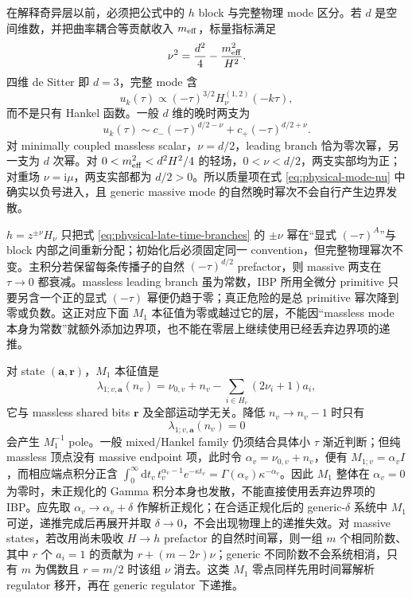 \documentclass[11pt,a4paper]{ctexart}
\newcommand{\dd}{\mathrm d}
\newcommand{\ii}{\mathrm i}
\begin{document}
在解释奇异层以前，必须把公式中的 $h$ block 与完整物理 mode 区分。若 $d$ 是空间维数，并把曲率耦合等贡献收入 $m_{\rm eff}$，标量指标满足
\begin{equation}
 \nu^2=\frac{d^2}{4}-\frac{m_{\rm eff}^2}{H^2}.
 \label{eq:physical-mode-nu}
\end{equation}
四维 de Sitter 即 $d=3$，完整 mode 含
\begin{equation}
 u_k(\tau)\propto(-\tau)^{3/2}H_\nu^{(1,2)}(-k\tau),
 \label{eq:physical-mode-full-power}
\end{equation}
而不是只有 Hankel 函数。一般 $d$ 维的晚时两支为
\begin{equation}
 u_k(\tau)\sim c_-(-\tau)^{d/2-\nu}
 +c_+(-\tau)^{d/2+\nu}.
 \label{eq:physical-late-time-branches}
\end{equation}
对 minimally coupled massless scalar，$\nu=d/2$，leading branch 恰为零次幂，另一支为 $d$ 次幂。对 $0<m_{\rm eff}^2<d^2H^2/4$ 的轻场，$0<\nu<d/2$，两支实部均为正；对重场 $\nu=\ii\mu$，两支实部都为 $d/2>0$。所以质量项在式 \eqref{eq:physical-mode-nu} 中确实以负号进入，且 generic massive mode 的自然晚时幂次不会自行产生边界发散。

$h=z^{\pm\nu}H_\nu$ 只把式 \eqref{eq:physical-late-time-branches} 的 $\pm\nu$ 幂在“显式 $(-\tau)^A$”与 block 内部之间重新分配；初始化后必须固定同一 convention，但完整物理幂次不变。主积分若保留每条传播子的自然 $(-\tau)^{d/2}$ prefactor，则 massive 两支在 $\tau\to0$ 都衰减。massless leading branch 虽为常数，IBP 所用全微分 primitive 只要另含一个正的显式 $(-\tau)$ 幂便仍趋于零；真正危险的是总 primitive 幂次降到零或负数。这正对应下面 $M_1$ 本征值为零或越过它的层，不能因“massless mode 本身为常数”就额外添加边界项，也不能在零层上继续使用已经丢弃边界项的递推。

对 state $(\bm a,\bm r)$，$M_1$ 本征值是
\begin{equation}
 \lambda_{1;v,\bm a}(n_v)
 =\nu_{0,v}+n_v
 -\sum_{i\in H_v}(2\nu_i+1)a_i,
 \label{eq:M1-general-eigenvalue}
\end{equation}
它与 massless shared bits $\bm r$ 及全部运动学无关。降低 $n_v\to n_v-1$ 时只有
\begin{equation}
 \lambda_{1;v,\bm a}(n_v)=0
 \label{eq:M1-lowering-resonance}
\end{equation}
会产生 $M_1^{-1}$ pole。一般 mixed/Hankel family 仍须结合具体小 $\tau$ 渐近判断；但纯 massless 顶点没有 massive endpoint 项，此时令 $\alpha_v=\nu_{0,v}+n_v$，便有 $M_{1;v}=\alpha_v I$，而相应端点积分正含 $\int_0^\infty\!\dd t_v\,t_v^{\alpha_v-1}e^{-\kappa t_v}=\Gamma(\alpha_v)\kappa^{-\alpha_v}$。因此 $M_1$ 整体在 $\alpha_v=0$ 为零时，未正规化的 Gamma 积分本身也发散，不能直接使用丢弃边界项的 IBP。应先取 $\alpha_v\to\alpha_v+\delta$ 作解析正规化；在合适正规化后的 generic-$\delta$ 系统中 $M_1$ 可逆，递推完成后再展开并取 $\delta\to0$，不会出现物理上的递推失效。对 massive states，若改用尚未吸收 $H\to h$ prefactor 的自然时间幂，则一组 $m$ 个相同阶数、其中 $r$ 个 $a_i=1$ 的贡献为 $r+(m-2r)\nu$；generic 不同阶数不会系统相消，只有 $m$ 为偶数且 $r=m/2$ 时该组 $\nu$ 消去。这类 $M_1$ 零点同样先用时间幂解析 regulator 移开，再在 generic regulator 下递推。
\end{document}
